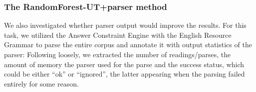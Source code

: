 \documentclass[a4paper,10pt]{scrartcl}
\theoremstyle{style}
\begin{document}













\subsubsection{The RandomForest-UT+parser method}
We also investigated whether parser output would improve the results. For this task, we utilized the Answer Constraint Engine \citep{ace} with the English Resource Grammar \citep{copestake2002implementing} to parse the entire corpus and annotate it with output statistics of the parser: Following \cite{wagner2007comparative} loosely, we extracted the number of readings/parses, the amount of memory the parser used for the parse and the success status, which could be either ``ok'' or ``ignored'', the latter appearing when the parsing failed entirely for some reason.
\end{document}
